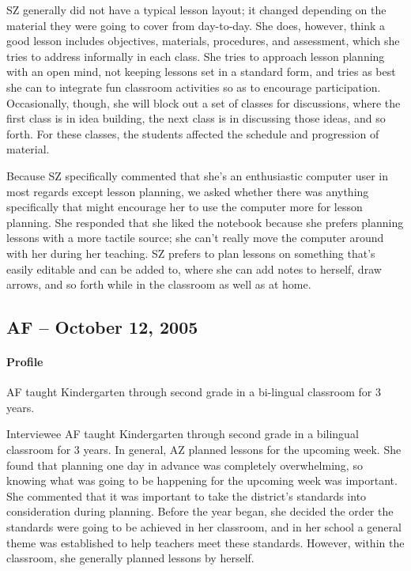 \documentclass[12pt,titlepage]{article}
\begin{document}
SZ generally did not have a typical lesson layout; it changed depending on the
material they were going to cover from day-to-day.  She does, however, think a
good lesson includes objectives, materials, procedures, and assessment, which
she tries to address informally in each class.  She tries to approach lesson
planning with an open mind, not keeping lessons set in a standard form, and
tries as best she can to integrate fun classroom activities so as to encourage
participation.  Occasionally, though, she will block out a set of classes for
discussions, where the first class is in idea building, the next class is in
discussing those ideas, and so forth.  For these classes, the students affected
the schedule and progression of material.

Because SZ specifically commented that she's an enthusiastic computer user in
most regards except lesson planning, we asked whether there was anything
specifically that might encourage her to use the computer more for lesson
planning.  She responded that she liked the notebook because she prefers
planning lessons with a more tactile source; she can't really move the computer
around with her during her teaching.  SZ prefers to plan lessons on something
that's easily editable and can be added to, where she can add notes to herself,
draw arrows, and so forth while in the classroom as well as at home.

\subsection{AF -- October 12, 2005}
\paragraph{Profile} AF taught Kindergarten through second grade in a bi-lingual
classroom for 3 years.

Interviewee AF taught Kindergarten through second grade in a bilingual classroom
for 3 years.  In general, AZ planned lessons for the upcoming week.  She found
that planning one day in advance was completely overwhelming, so knowing what
was going to be happening for the upcoming week was important.  She commented
that it was important to take the district's standards into consideration during
planning.  Before the year began, she decided the order the standards were going
to be achieved in her classroom, and in her school a general theme was
established to help teachers meet these standards.  However, within the
classroom, she generally planned lessons by herself.
\end{document}
